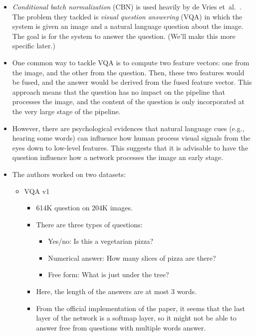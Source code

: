 \documentclass[10pt]{article}
\newcommand{\etal}{{et~al.}}
\begin{document}
  \begin{itemize}
  	\item \emph{Conditional batch normalization} (CBN) is used heavily by de Vries \etal~\cite{deVries:2017}. The problem they tackled is \emph{visual question answering} (VQA) in which the system is given an image and a natural language question about the image. The goal is for the system to answer the question. (We'll make this more specific later.)

    \item One common way to tackle VQA is to compute two feature vectors: one from the image, and the other from the question. Then, these two features would be fused, and the answer would be derived from the fused feature vector. This approach means that the question has no impact on the pipeline that processes the image, and the content of the question is only incorporated at the very large stage of the pipeline.

    \item However, there are psychological evidences that natural language cues (e.g., hearing some words) can influence how human process visual signals from the eyes down to low-level features. This suggests that it is advisable to have the question influence how a network processes the image an early stage.

    \item The authors worked on two datasets:
    \begin{itemize}
      \item VQA v1 \cite{Antol:2015}

      \begin{itemize}
        \item 614K question on 204K images. 
        
        \item There are three types of questions: 
        
        \begin{itemize}
          \item Yes/no: Is this a vegetarian pizza?
          \item Numerical answer: How many slices of pizza are there?
          \item Free form: What is just under the tree?
        \end{itemize}

        \item Here, the length of the answers are at most 3 words.

        \item From the official implementation of the paper, it seems that the last layer of the network is a softmap layer, so it might not be able to answer free from questions with multiple words answer. 


\end{itemize}
\end{itemize}
\end{itemize}
\end{document}
